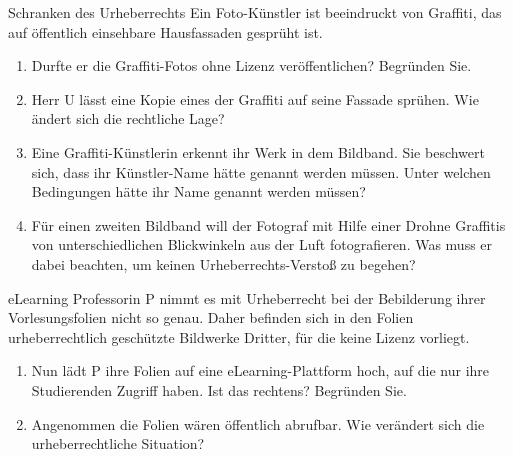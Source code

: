 \documentclass{article}
\begin{document}
\begin{exercise}{Schranken des Urheberrechts}
  Ein Foto-Künstler ist beeindruckt von Graffiti, das auf öffentlich einsehbare Hausfassaden gesprüht ist.
  \begin{enumerate}
    \item Durfte er die Graffiti-Fotos ohne Lizenz veröffentlichen? Begründen Sie.
    \item Herr U lässt eine Kopie eines der Graffiti auf seine Fassade sprühen. Wie ändert sich die rechtliche Lage?
    \item Eine Graffiti-Künstlerin erkennt ihr Werk in dem Bildband. Sie beschwert sich, dass ihr Künstler-Name hätte genannt werden müssen. Unter welchen Bedingungen hätte ihr Name genannt werden müssen?
    \item Für einen zweiten Bildband will der Fotograf mit Hilfe einer Drohne Graffitis von unterschiedlichen Blickwinkeln aus der Luft fotografieren. Was muss er dabei beachten, um keinen Urheberrechts-Verstoß zu begehen?
  \end{enumerate}
\end{exercise}

\begin{exercise}{eLearning}
  Professorin P nimmt es mit Urheberrecht bei der Bebilderung ihrer Vorlesungsfolien nicht so genau. Daher befinden sich in den Folien urheberrechtlich geschützte Bildwerke Dritter, für die keine Lizenz vorliegt.
  \begin{enumerate}
    \item Nun lädt P ihre Folien auf eine eLearning-Plattform hoch, auf die nur ihre Studierenden Zugriff haben. Ist das rechtens? Begründen Sie.
    \item Angenommen die Folien wären öffentlich abrufbar. Wie verändert sich die urheberrechtliche Situation?
  \end{enumerate}
\end{exercise}
\end{document}
